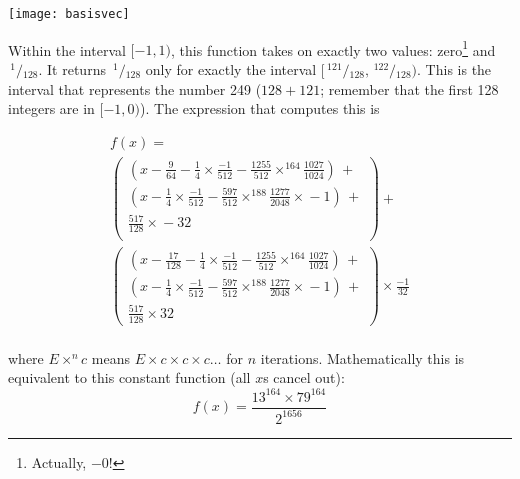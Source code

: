 \documentclass[twocolumn]{article}
\newcommand\sfrac[2]{\!{}\,^{#1}\!/{}\!_{#2}}
\begin{document}
\texttt{[image: basisvec]}


Within the interval $[-1, 1)$, this function takes on exactly two
  values: zero\footnote{Actually, $-0$!} and $\sfrac{1}{128}$. It returns
  $\sfrac{1}{128}$ only for exactly the interval $[\sfrac{121}{128},
    \sfrac{122}{128})$. This is the interval that represents the
  number 249 ($128 + 121$; remember that the first 128 integers are in
  $[-1, 0)$). The expression that computes this is

\[
\begin{array}{l}
  f(x) = \\[0.5em]
  \left(
  \begin{array}{l}
    (x - \frac{9}{64} - \frac{1}{4} \times{} \frac{-1}{512} - \frac{1255}{512} \times^{\scriptscriptstyle 164} \frac{1027}{1024})\, + \\[0.5em]
    (x - \frac{1}{4} \times{} \frac{-1}{512} - \frac{597}{512} \times^{\scriptscriptstyle 188} \frac{1277}{2048} \times{} -\!1)\, + \\[0.5em]
    \frac{517}{128} \times{} -32 \\[0.5em]
  \end{array}
  \right) + \\[2em]
%
  \left(
  \begin{array}{l}
    (x - \frac{17}{128} - \frac{1}{4} \times{} \frac{-1}{512} - \frac{1255}{512} \times^{\scriptscriptstyle 164} \frac{1027}{1024})\, + \\[0.5em]
    (x - \frac{1}{4} \times{} \frac{-1}{512} - \frac{597}{512} \times^{\scriptscriptstyle 188} \frac{1277}{2048} \times{} -\!1)\, + \\[0.5em]
    \frac{517}{128} \times{} 32
  \end{array}
  \right) \times{} \frac{-1}{32} \\
\end{array}
\]

\noindent where $E \times^{n} c$ means $E \times c \times c \times c \ldots$ for $n$ iterations.
Mathematically this is equivalent to this constant function (all $x$s cancel out):
$$f(x) = \frac{13^{164} \times{} 79^{164}}{2^{1656}}$$
\end{document}
